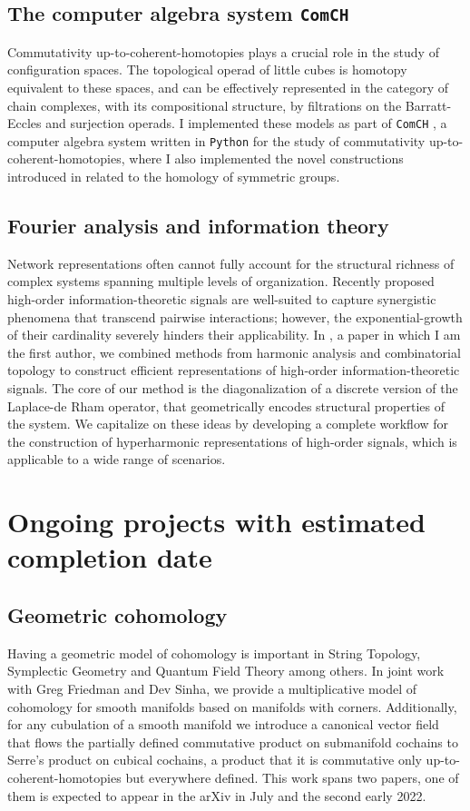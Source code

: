 \documentclass{amsart}
\theoremstyle{definition}
\begin{document}
	\subsection{The computer algebra system \texttt{ComCH}}
	Commutativity up-to-coherent-homotopies plays a crucial role in the study of configuration spaces.
	The topological operad of little cubes is homotopy equivalent to these spaces, and can be effectively represented in the category of chain complexes, with its compositional structure, by filtrations on the Barratt-Eccles and surjection operads.
	I implemented these models as part of \texttt{ComCH} \cite{medina2021computer}, a computer algebra system written in \texttt{Python} for the study of commutativity up-to-coherent-homotopies, where I also implemented the novel constructions introduced in \cite{medina2020odd} related to the homology of symmetric groups.
	
	\subsection{Fourier analysis and information theory}	
	Network representations often cannot fully account for the structural richness of complex systems spanning multiple levels of organization.
	Recently proposed high-order information-theoretic signals are well-suited to capture synergistic phenomena that transcend pairwise interactions; however, the exponential-growth of their cardinality severely hinders their applicability.
	In \cite{medina2021hyperharmonic}, a paper in which I am the first author, we combined methods from harmonic analysis and combinatorial topology to construct efficient representations of high-order information-theoretic signals.
	The core of our method is the diagonalization of a discrete version of the Laplace-de Rham operator, that geometrically encodes structural properties of the system.
	We capitalize on these ideas by developing a complete workflow for the construction of hyperharmonic representations of high-order signals, which is applicable to a wide range of scenarios.
	
	\section{Ongoing projects with estimated completion date}
	
	\subsection{Geometric cohomology}
	Having a geometric model of cohomology is important in String Topology, Symplectic Geometry and Quantum Field Theory among others.
	In joint work with Greg Friedman and Dev Sinha, we provide a multiplicative model of cohomology for smooth manifolds based on manifolds with corners.
	Additionally, for any cubulation of a smooth manifold we introduce a canonical vector field that flows the partially defined commutative product on submanifold cochains to Serre's product on cubical cochains, a product that it is commutative only up-to-coherent-homotopies but everywhere defined.
	This work spans two papers, one of them is expected to appear in the arXiv in July and the second early 2022.
	
\end{document}

